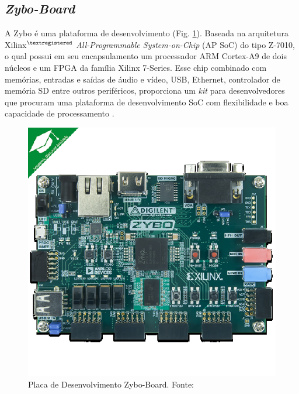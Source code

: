 \subsection{\textit{Zybo-Board}}
A Zybo é uma plataforma de desenvolvimento (Fig. \ref{Zybo Board}).
Baseada na arquitetura Xilinx$^{\textregistered}$ \textit{All-Programmable System-on-Chip} (AP SoC)
do tipo Z-7010, o qual possui em seu encapsulamento um processador ARM Cortex-A9 de 
dois núcleos e um FPGA da família Xilinx 7-Series. Esse chip combinado com memórias, entradas 
e saídas de áudio e vídeo, USB, Ethernet, controlador de memória SD entre outros periféricos,
proporciona um \textit{kit} para desenvolvedores que procuram uma plataforma de desenvolvimento SoC com flexibilidade e boa capacidade de processamento \cite{DigilentZybo}.  

\begin{figure}[h]
	\centering
	\includegraphics[keepaspectratio=true,scale=1.0]{figuras/zyboboard.eps}
	\caption{Placa de Desenvolvimento Zybo-Board. Fonte: \cite{DigilentZybo}}
	\label{Zybo Board}
\end{figure}

